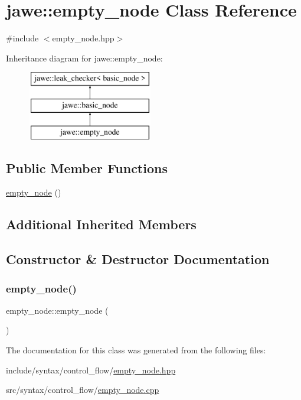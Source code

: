 \hypertarget{classjawe_1_1empty__node}{}\section{jawe\+:\+:empty\+\_\+node Class Reference}
\label{classjawe_1_1empty__node}


{\ttfamily \#include $<$empty\+\_\+node.\+hpp$>$}

Inheritance diagram for jawe\+:\+:empty\+\_\+node\+:\begin{figure}[H]
\begin{center}
\leavevmode
\includegraphics[height=3.000000cm]{classjawe_1_1empty__node}
\end{center}
\end{figure}
\subsection*{Public Member Functions}
\begin{DoxyCompactItemize}
\item 
\hyperlink{classjawe_1_1empty__node_adbc815c4256a01b49cbff01f9dc55431}{empty\+\_\+node} ()
\end{DoxyCompactItemize}
\subsection*{Additional Inherited Members}


\subsection{Constructor \& Destructor Documentation}
\mbox{\label{classjawe_1_1empty__node_adbc815c4256a01b49cbff01f9dc55431}} 
\subsubsection{\texorpdfstring{empty\+\_\+node()}{empty\_node()}}
{\footnotesize\ttfamily empty\+\_\+node\+::empty\+\_\+node (\begin{DoxyParamCaption}{ }\end{DoxyParamCaption})}



The documentation for this class was generated from the following files\+:\begin{DoxyCompactItemize}
\item 
include/syntax/control\+\_\+flow/\hyperlink{empty__node_8hpp}{empty\+\_\+node.\+hpp}\item 
src/syntax/control\+\_\+flow/\hyperlink{empty__node_8cpp}{empty\+\_\+node.\+cpp}\end{DoxyCompactItemize}

